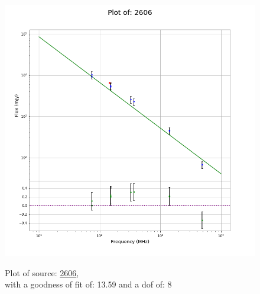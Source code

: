\documentclass{article}
\begin{document}
\begin{figure}[H]
    \centering
    \begin{minipage}{.5\textwidth}
        \centering
        \includegraphics[scale = 0.35]{KmeulenTrap4P23_1hr/1hr2606.png}
        \captionsetup{labelformat=empty}
        \caption{Plot of source: \href{http://banana.transientskp.org/r4/vlo_KmeulenTrap4P23/runningcatalog/2606}{2606},\\with a goodness of fit of: 13.59 and a dof of: 8}
        \addtocounter{figure}{-1}
        \label{KmeulenTrap4P23:1hr:2606:plot}
    \end{minipage}%
    \begin{minipage}{0.5\textwidth}
        \centering


\end{minipage}
\end{figure}
\end{document}

